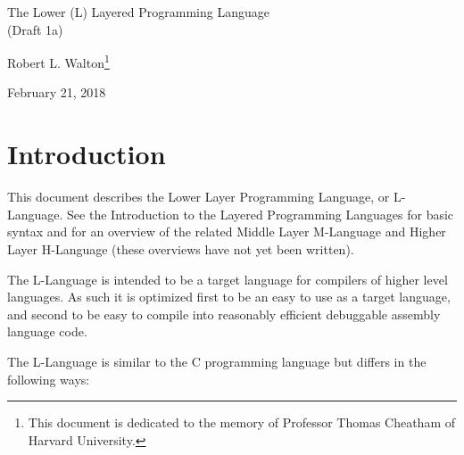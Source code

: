 \documentclass[12pt]{article}
\makeatletter
\renewcommand\tableofcontents{%
    \begin{list}{}%
	     {\setlength{\itemsep}{0in}%
	      \setlength{\topsep}{0in}%
	      \setlength{\parsep}{1ex}%
	      \setlength{\labelwidth}{0in}%
	      \setlength{\baselineskip}{1.5ex}%
	      \setlength{\leftmargin}{1.0in}%
	      \setlength{\rightmargin}{1.0in}}%
    \item\@starttoc{toc}%
    \end{list}}
\makeatother
\begin{document}
        
\begin{center}

{\Large
The Lower (L) Layered Programming Language \\[0.5ex]
(Draft 1a)}

\medskip

Robert L. Walton\footnote{This document is dedicated to the memory
of Professor Thomas Cheatham of Harvard University.}

February 21, 2018
 
\end{center}

{\small \tableofcontents}

\newpage

\section{Introduction}

This document describes the Lower Layer Programming Language, or
L-Language.  See the Introduction to the Layered
Programming Languages for basic syntax and for an overview of the related
Middle Layer M-Language and Higher Layer H-Language (these overviews
have not yet been written).

The L-Language is intended to be a target language for compilers of
higher level languages.  As such it is optimized first to be an easy to 
use as a target language, and second to be easy to
compile into reasonably efficient debuggable assembly language code.

The L-Language is similar to the C programming language
but differs in the following ways:
\end{document}
